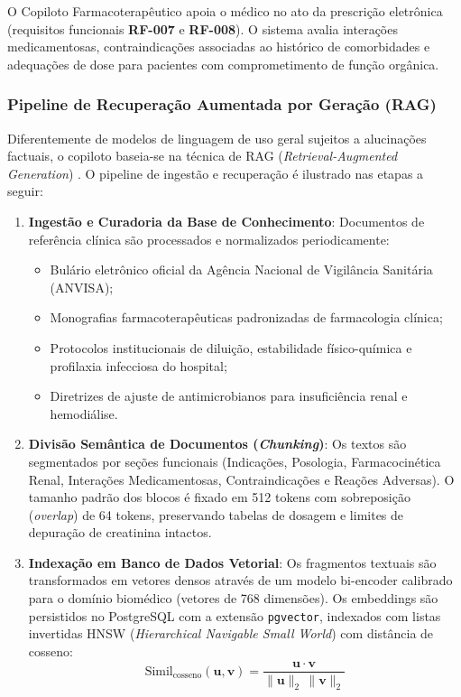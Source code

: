 O Copiloto Farmacoterapêutico apoia o médico no ato da prescrição eletrônica (requisitos funcionais \textbf{RF-007} e \textbf{RF-008}). O sistema avalia interações medicamentosas, contraindicações associadas ao histórico de comorbidades e adequações de dose para pacientes com comprometimento de função orgânica.

\subsubsection{Pipeline de Recuperação Aumentada por Geração (RAG)}
Diferentemente de modelos de linguagem de uso geral sujeitos a alucinações factuais, o copiloto baseia-se na técnica de RAG (\textit{Retrieval-Augmented Generation}) \cite{lewis_rag:2020}. O pipeline de ingestão e recuperação é ilustrado nas etapas a seguir:

\begin{enumerate}
    \item \textbf{Ingestão e Curadoria da Base de Conhecimento}: Documentos de referência clínica são processados e normalizados periodicamente:
    \begin{itemize}[noitemsep]
        \item Bulário eletrônico oficial da Agência Nacional de Vigilância Sanitária (ANVISA);
        \item Monografias farmacoterapêuticas padronizadas de farmacologia clínica;
        \item Protocolos institucionais de diluição, estabilidade físico-química e profilaxia infecciosa do hospital;
        \item Diretrizes de ajuste de antimicrobianos para insuficiência renal e hemodiálise.
    \end{itemize}
    \item \textbf{Divisão Semântica de Documentos (\textit{Chunking})}: Os textos são segmentados por seções funcionais (Indicações, Posologia, Farmacocinética Renal, Interações Medicamentosas, Contraindicações e Reações Adversas). O tamanho padrão dos blocos é fixado em 512 tokens com sobreposição (\textit{overlap}) de 64 tokens, preservando tabelas de dosagem e limites de depuração de creatinina intactos.
    \item \textbf{Indexação em Banco de Dados Vetorial}: Os fragmentos textuais são transformados em vetores densos através de um modelo bi-encoder calibrado para o domínio biomédico (vetores de 768 dimensões). Os embeddings são persistidos no PostgreSQL com a extensão \texttt{pgvector}, indexados com listas invertidas HNSW (\textit{Hierarchical Navigable Small World}) com distância de cosseno:
    \begin{equation}
        \text{Simil}_{\text{cosseno}}(\mathbf{u}, \mathbf{v}) = \frac{\mathbf{u} \cdot \mathbf{v}}{\|\mathbf{u}\|_2 \, \|\mathbf{v}\|_2}
    \end{equation}
\end{enumerate}

